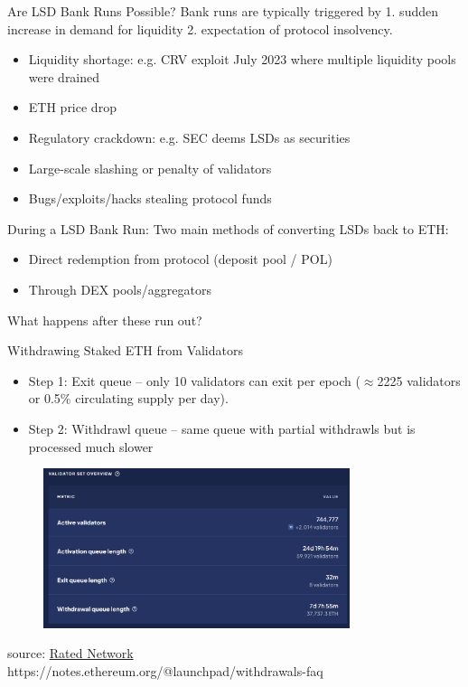 \documentclass{beamer}
\begin{document}
\begin{frame}{Are LSD Bank Runs Possible?}
    Bank runs are typically triggered by 1. sudden increase in demand for liquidity 2. expectation of protocol insolvency.\\  
    \bigskip
    \begin{itemize}
        \item Liquidity shortage: e.g. CRV exploit July 2023 where multiple liquidity pools were drained
        \item ETH price drop
        \item Regulatory crackdown: e.g. SEC deems LSDs as securities
        \item Large-scale slashing or penalty of validators
        \item Bugs/exploits/hacks stealing protocol funds
    \end{itemize}
\end{frame}


\begin{frame}{During a LSD Bank Run:}
    Two main methods of converting LSDs back to ETH:
    \begin{itemize}
        \item Direct redemption from protocol (deposit pool / POL)
        \item Through DEX pools/aggregators
    \end{itemize}
    \bigskip
    What happens after these run out?\\
\end{frame}

\begin{frame}{Withdrawing Staked ETH from Validators}
    \begin{itemize}
        \item Step 1: Exit queue -- only 10 validators can exit per epoch ($\approx$2225 validators or 0.5\% circulating supply per day).
        \item Step 2: Withdrawl queue -- same queue with partial withdrawls but is processed much slower
    \end{itemize}
    \begin{figure}
        \centering
        \includegraphics[width=0.8\textwidth]{figures/rated_queues.png}
    \end{figure}
    \tiny{source: \href{https://www.rated.network/overview?network=mainnet&timeWindow=30d&rewardsMetric=average}{Rated Network}}\\
    https://notes.ethereum.org/@launchpad/withdrawals-faq
\end{frame}
\end{document}
